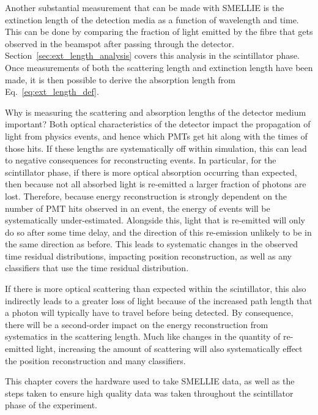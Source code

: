 Another substantial measurement that can be made with SMELLIE is the extinction length of the detection media as a function of wavelength and time. This can be done by comparing the fraction of light emitted by the fibre that gets observed in the beamspot after passing through the detector. Section~\ref{sec:ext_length_analysis} covers this analysis in the scintillator phase. Once measurements of both the scattering length and extinction length have been made, it is then possible to derive the absorption length from Eq.~\ref{eq:ext_length_def}.

Why is measuring the scattering and absorption lengths of the detector medium important? Both optical characteristics of the detector impact the propagation of light from physics events, and hence which PMTs get hit along with the times of those hits. If these lengths are systematically off within simulation, this can lead to negative consequences for reconstructing events. In particular, for the scintillator phase, if there is more optical absorption occurring than expected, then because not all absorbed light is re-emitted a larger fraction of photons are lost. Therefore, because energy reconstruction is strongly dependent on the number of PMT hits observed in an event, the energy of events will be systematically under-estimated. Alongside this, light that is re-emitted will only do so after some time delay, and the direction of this re-emission unlikely to be in the same direction as before. This leads to systematic changes in the observed time residual distributions, impacting position reconstruction, as well as any classifiers that use the time residual distribution.

If there is more optical scattering than expected within the scintillator, this also indirectly leads to a greater loss of light because of the increased path length that a photon will typically have to travel before being detected. By consequence, there will be a second-order impact on the energy reconstruction from systematics in the scattering length. Much like changes in the quantity of re-emitted light, increasing the amount of scattering will also systematically effect the position reconstruction and many classifiers.

This chapter covers the hardware used to take SMELLIE data, as well as the steps taken to ensure high quality data was taken throughout the scintillator phase of the experiment.


